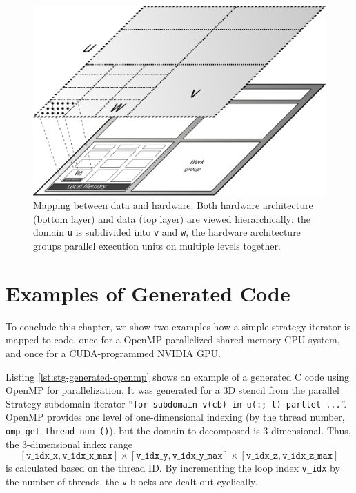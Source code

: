 \begin{figure}
	\centering
 	\includegraphics[width=0.8\columnwidth]{fig/archmapping.pdf}
	\caption{Mapping between data and hardware. Both hardware architecture (bottom layer) and data (top layer) are viewed
		hierarchically: the domain \texttt{u} is subdivided into \texttt{v} and \texttt{w}, the hardware architecture groups parallel execution
		units on multiple levels together.}
	\label{fig:hwmapping}
\end{figure}


\section{Examples of Generated Code}

To conclude this chapter, we show two examples how a simple strategy iterator is mapped to code,
once for a OpenMP-parallelized shared memory CPU system, and once for a CUDA-programmed NVIDIA GPU.

Listing \ref{lst:stg-generated-openmp} shows an example of a generated C code using OpenMP for parallelization.
It was generated for a 3D stencil from the parallel Strategy subdomain iterator
``\lstinline[language=strategy]!for subdomain v(cb) in u(:; t) parllel ...!''.
OpenMP provides one level of one-dimensional indexing (by the thread number, \texttt{omp\_get\_thread\_num ()}), but
the domain to decomposed is $3$-dimensional. Thus, the $3$-dimensional index range
\[
	[\mathtt{v\_idx\_x}, \mathtt{v\_idx\_x\_max}] \times
	[\mathtt{v\_idx\_y}, \mathtt{v\_idx\_y\_max}] \times [\mathtt{v\_idx\_z}, \mathtt{v\_idx\_z\_max}]
\]
is calculated based on the thread ID. By incrementing the loop index \texttt{v\_idx} by the number of threads,
the \texttt{v} blocks are dealt out cyclically.

